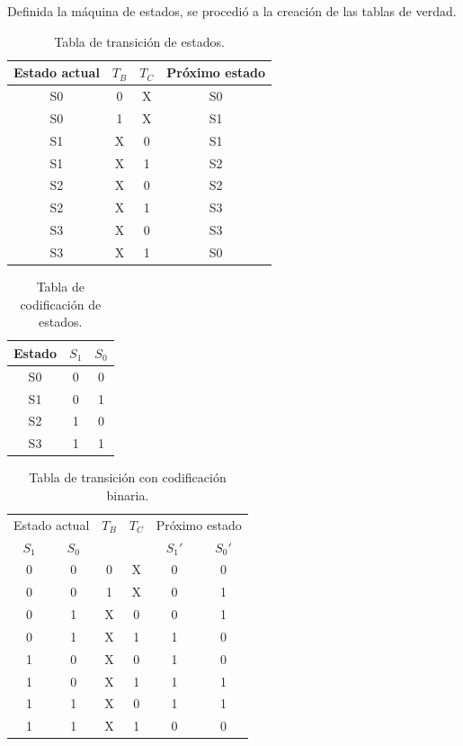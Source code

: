 \documentclass[12pt,onecolumn]{IEEEtran}
\begin{document}
Definida la máquina de estados, se procedió a la creación de las
tablas de verdad.

\begin{table}[H]
\centering
\caption{Tabla de transición de estados.}
\label{tab:transicion}
\begin{tabular}{c c c c}
\hline
Estado actual & $T_B$ & $T_C$ & Próximo estado \\
\hline
S0 & 0 & X & S0 \\
S0 & 1 & X & S1 \\
S1 & X & 0 & S1 \\
S1 & X & 1 & S2 \\
S2 & X & 0 & S2 \\
S2 & X & 1 & S3 \\
S3 & X & 0 & S3 \\
S3 & X & 1 & S0 \\
\hline
\end{tabular}
\end{table}

\begin{table}[H]
\centering
\caption{Tabla de codificación de estados.}
\label{tab:codificacion}
\begin{tabular}{c c c}
\hline
Estado & $S_1$ & $S_0$ \\
\hline
S0 & 0 & 0 \\
S1 & 0 & 1 \\
S2 & 1 & 0 \\
S3 & 1 & 1 \\
\hline
\end{tabular}
\end{table}

\begin{table}[H]
\centering
\caption{Tabla de transición con codificación binaria.}
\label{tab:transicion_bin}
\begin{tabular}{c c c c c c}
\hline
\multicolumn{2}{c}{Estado actual} & $T_B$ & $T_C$ &
\multicolumn{2}{c}{Próximo estado} \\
$S_1$ & $S_0$ & & & $S_1'$ & $S_0'$ \\
\hline
0 & 0 & 0 & X & 0 & 0 \\
0 & 0 & 1 & X & 0 & 1 \\
0 & 1 & X & 0 & 0 & 1 \\
0 & 1 & X & 1 & 1 & 0 \\
1 & 0 & X & 0 & 1 & 0 \\
1 & 0 & X & 1 & 1 & 1 \\
1 & 1 & X & 0 & 1 & 1 \\
1 & 1 & X & 1 & 0 & 0 \\
\hline
\end{tabular}
\end{table}
\end{document}
